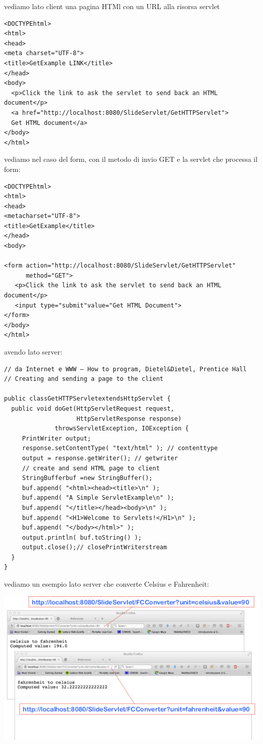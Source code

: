 \message{ !name(sd.tex)}\documentclass[a4paper,12pt, oneside]{book}
\begin{document}
vediamo lato client una pagina HTMl con un URL alla risorsa servlet
\begin{verbatim}
<DOCTYPEhtml>
<html>
<head>
<meta charset="UTF-8">
<title>GetExample LINK</title>
</head>
<body>
  <p>Click the link to ask the servlet to send back an HTML document</p>
  <a href="http://localhost:8080/SlideServlet/GetHTTPServlet"> 
  Get HTML document</a>
</body>
</html>
\end{verbatim}
vediamo nel caso del form, con il metodo di invio GET e la servlet che processa il form:
\begin{verbatim}
<DOCTYPEhtml>
<html>
<head>
<metacharset="UTF-8">
<title>GetExample</title>
</head>
<body>

<form action="http://localhost:8080/SlideServlet/GetHTTPServlet"
      method="GET">
   <p>Click the link to ask the servlet to send back an HTML document</p>
   <input type="submit"value="Get HTML Document">
</form>
</body>
</html>
\end{verbatim}
\newpage
avendo lato server:
\begin{verbatim}
// da Internet e WWW – How to program, Dietel&Dietel, Prentice Hall
// Creating and sending a page to the client

public classGetHTTPServletextendsHttpServlet {
  public void doGet(HttpServletRequest request,
                    HttpServletResponse response)
              throwsServletException, IOException {
     PrintWriter output;
     response.setContentType( "text/html" ); // contenttype
     output = response.getWriter(); // getwriter
     // create and send HTML page to client
     StringBufferbuf =new StringBuffer();
     buf.append( "<html><head><title>\n" );
     buf.append( "A Simple ServletExample\n" );
     buf.append( "</title></head><body>\n" );
     buf.append( "<H1>Welcome to Servlets!</H1>\n" );
     buf.append( "</body></html>" );
     output.println( buf.toString() );
     output.close();// closePrintWriterstream
  }
}
\end{verbatim}
vediamo un esempio lato server che converte Celsius e Fahrenheit:
\begin{center}
	\includegraphics[scale=0.7]{img/cel.png}
\end{center}
\end{document}
